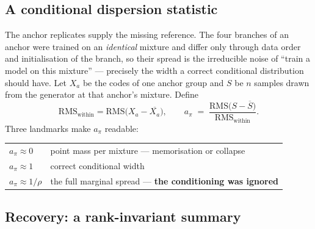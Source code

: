\subsection{A conditional dispersion statistic}
\label{app:atpi}

The anchor replicates supply the missing reference. The four branches of an anchor
were trained on an \emph{identical} mixture and differ only through data order and
initialisation of the branch, so their spread is the irreducible noise of ``train a
model on this mixture'' --- precisely the width a correct conditional distribution
should have. Let $X_a$ be the codes of one anchor group and $S$ be $n$ samples drawn
from the generator at that anchor's mixture. Define
%
\begin{equation}
\mathrm{RMS}_{\text{within}} = \mathrm{RMS}\big(X_a - \overline{X_a}\big),
\qquad
a_\pi \;=\; \frac{\mathrm{RMS}\big(S - \overline{S}\big)}{\mathrm{RMS}_{\text{within}}} .
\label{eq:atpi}
\end{equation}
%
Three landmarks make $a_\pi$ readable:

\begin{center}
\begin{tabular}{ll}
\toprule
$a_\pi \approx 0$   & point mass per mixture --- memorisation or collapse \\
$a_\pi \approx 1$   & correct conditional width \\
$a_\pi \approx 1/\rho$ & the full marginal spread --- \textbf{the conditioning was ignored} \\
\bottomrule
\end{tabular}
\end{center}

\subsection{Recovery: a rank-invariant summary}
\label{app:recovery}

